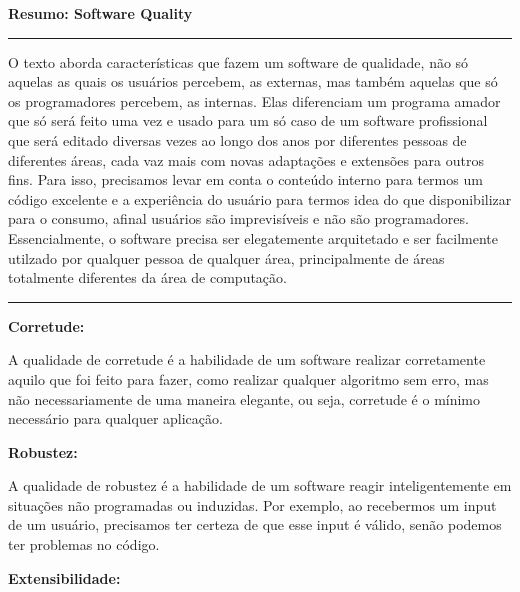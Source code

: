 \documentclass{article}
\begin{document}
\begin{center}

    \vspace*{-8mm}
    \textbf{\large{Resumo: Software Quality}}
    \vspace*{-4mm}

\end{center}

\noindent\rule{\textwidth}{0.5pt}

\bigskip

O texto aborda características que fazem um software de qualidade, não só aquelas as quais os usuários percebem, as externas, mas também aquelas que só os programadores percebem, as internas. Elas diferenciam um programa amador que só será feito uma vez e usado para um só caso de um software profissional que será editado diversas vezes ao longo dos anos por diferentes pessoas de diferentes áreas, cada vaz mais com novas adaptações e extensões para outros fins. Para isso, precisamos levar em conta o conteúdo interno para termos um código excelente e a experiência do usuário para termos idea do que disponibilizar para o consumo, afinal usuários são imprevisíveis e não são programadores. Essencialmente, o software precisa ser elegatemente arquitetado e ser facilmente utilzado por qualquer pessoa de qualquer área, principalmente de áreas totalmente diferentes da área de computação.

\bigskip

\noindent\rule{\textwidth}{0.5pt}

\bigskip

\textbf{Corretude:}

\medskip

A qualidade de corretude é a habilidade de um software realizar corretamente aquilo que foi feito para fazer, como realizar qualquer algoritmo sem erro, mas não necessariamente de uma maneira elegante, ou seja, corretude é o mínimo necessário para qualquer aplicação.

\medskip

\textbf{Robustez:}

\medskip

A qualidade de robustez é a habilidade de um software reagir inteligentemente em situações não programadas ou induzidas. Por exemplo, ao recebermos um input de um usuário, precisamos ter certeza de que esse input é válido, senão podemos ter problemas no código. 

\medskip

\textbf{Extensibilidade:}
\end{document}
